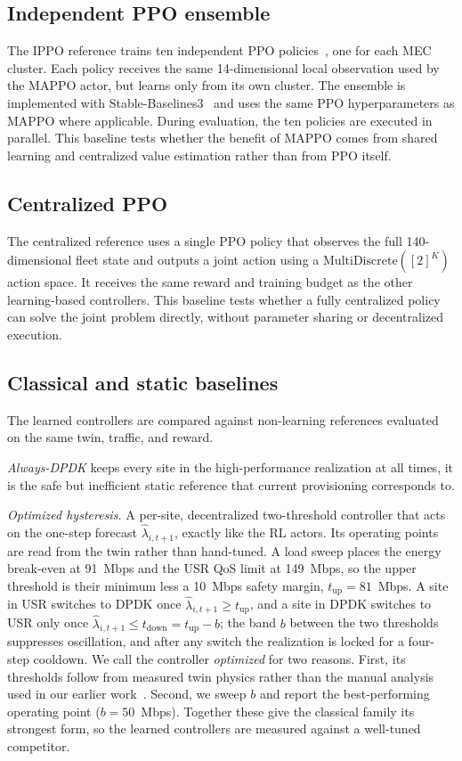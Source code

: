 \documentclass[10pt,conference,letterpaper]{IEEEtran}
\begin{document}
\subsection{Independent PPO ensemble}

The IPPO reference trains ten independent PPO policies~\cite{ref:ippo}, one for
each MEC cluster. Each policy receives the same 14-dimensional local observation
used by the MAPPO actor, but learns only from its own cluster. The ensemble is
implemented with Stable-Baselines3~\cite{ref:sb3} and uses the same PPO
hyperparameters as MAPPO where applicable. During evaluation, the ten policies
are executed in parallel. This baseline tests whether the benefit of MAPPO comes
from shared learning and centralized value estimation rather than from PPO
itself.

\subsection{Centralized PPO}

The centralized reference uses a single PPO policy that observes the full
140-dimensional fleet state and outputs a joint action using a
$\mathrm{MultiDiscrete}([2]^K)$ action space. It receives the same reward and
training budget as the other learning-based controllers. This baseline tests
whether a fully centralized policy can solve the joint problem directly, without
parameter sharing or decentralized execution.

\subsection{Classical and static baselines}
The learned controllers are compared against non-learning references
evaluated on the same twin, traffic, and reward.

\emph{Always-DPDK} keeps every site in the high-performance realization at all times, it is the safe but inefficient static reference that current provisioning corresponds to.

\emph{Optimized hysteresis.} A per-site, decentralized two-threshold
controller that acts on the one-step forecast $\hat\lambda_{i,t+1}$,
exactly like the RL actors. Its operating points are read from the twin
rather than hand-tuned. A load sweep places the energy break-even at
91~Mbps and the USR QoS limit at 149~Mbps, so the upper threshold is their minimum less a 10~Mbps safety margin,
$t_{\mathrm{up}}=81$~Mbps. A site in USR switches to DPDK once
$\hat\lambda_{i,t+1}\!\ge\!t_{\mathrm{up}}$, and a site in DPDK switches
to USR only once
$\hat\lambda_{i,t+1}\!\le\!t_{\mathrm{down}}=t_{\mathrm{up}}-b$; the band
$b$ between the two thresholds suppresses oscillation, and after any
switch the realization is locked for a four-step cooldown. We call the
controller \emph{optimized} for two reasons. First, its thresholds
follow from measured twin physics rather than the manual analysis used
in our earlier work~\cite{ref:slices}. Second, we sweep
$b$ and report the best-performing operating
point ($b=50$~Mbps). Together these give the classical family its
strongest form, so the learned controllers are measured against a
well-tuned competitor.
\end{document}
